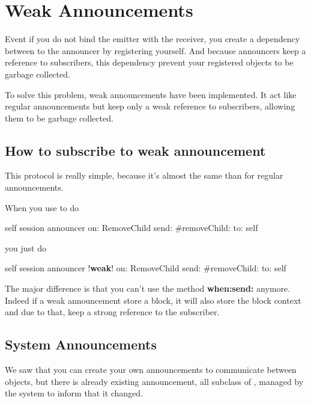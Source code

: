 \documentclass[a4paper,10pt,twoside]{book}
\begin{document}


\section{Weak Announcements}

Event if you do not bind the emitter with the receiver, you create a dependency between to the announcer by registering yourself. And because announcers keep a reference to subscribers, this dependency prevent your registered objects to be garbage collected.

To solve this problem, weak announcements have been implemented. It act like regular announcements but keep only a weak reference to subscribers, allowing them to be garbage collected.

\subsection{How to subscribe to weak announcement}

This protocol is really simple, because it's almost the same than for regular announcements.

When you use to do

\begin{code}{}
self session announcer on: RemoveChild send: #removeChild: to: self
\end{code}

you just do

\begin{code}{}
self session announcer !\textbf{weak}! on: RemoveChild send: #removeChild: to: self
\end{code}

The major difference is that you can't use the method \textbf{when:send:} anymore. Indeed if a weak announcement store a block, it will also store the block context and due to that, keep a strong reference to the subscriber.

\subsection{System Announcements}

We saw that you can create your own announcements to communicate between objects, but there is already existing announcement, all subclass of , managed by the system to inform that it changed.
\end{document}

